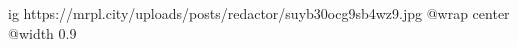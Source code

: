 
 
 
 
 

\ifcmt
  ig https://mrpl.city/uploads/posts/redactor/suyb30ocg9sb4wz9.jpg
  @wrap center
  @width 0.9
\fi
